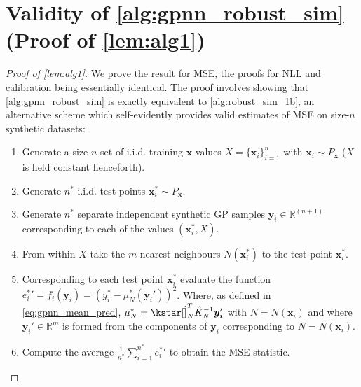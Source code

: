\section{Validity of \autoref{alg:gpnn_robust_sim} (Proof of \autoref{lem:alg1})}
\label{proof:alg1}
\begin{proof}[Proof of \autoref{lem:alg1}]

We prove the result for MSE, the proofs for NLL and calibration being essentially identical.
\newline\newline
The proof involves showing that \autoref{alg:gpnn_robust_sim} is exactly equivalent to \autoref{alg:robust_sim_1b}, an alternative scheme which self-evidently provides valid estimates of MSE on size-$n$ synthetic datasets:


\setcounter{algorithm}{1}
\renewcommand{\thealgorithm}{1\alph{algorithm}}
\begin{algorithm}[ht]
\begin{enumerate}
    \item Generate a size-$n$ set of i.i.d. training $\bm{x}$-values $X = \{\bm{x}_i\}_{i=1}^{n}$ with $\bm{x}_i \sim P_\mathbf{x}$ ($X$ is held constant henceforth).
    \item Generate $n^*$  i.i.d. test points $\bm{x}_i^* \sim P_\mathbf{x}$. 
    \item Generate $n^*$ separate independent synthetic GP samples $\bm{y}_i \in \mathbb{R}^{(n+1)}$ corresponding to each of the values $(\bm{x}_i^*,X)$.  
    \item From within $X$ take the $m$ nearest-neighbours $N(\bm{x}_i^*)$ to the test point $\bm{x}_i^*$.
    \item Corresponding to each test point $\bm{x}_i^*$ evaluate the function ${e_i^*}' = f_i(\bm{y}_i) = (y_i^* - \mu_N^*(\bm{y}_i') )^2$. Where, as defined in \autoref{eq:gpnn_mean_pred}, $\mu_N^* = \kstar[\hat]_N^T \hat{K}_N^{-1}\bm{y_i}'$ with $N = N(\bm{x}_i)$ and where $\bm{y}_i' \in \mathbb{R}^m$ is formed from the components of $\bm{y}_i$ corresponding to $N = N(\bm{x}_i)$. \label{alg:line:eval}
    \item Compute the average $\frac{1}{n^*} \sum_{i=1}^{n^*} {e_i^*}'$ to obtain the MSE statistic.
\end{enumerate}
\caption{Simulation of GPnn Robustness and Limiting Behaviour (Expensive)}
\label{alg:robust_sim_1b}
\end{algorithm}



\end{proof}
